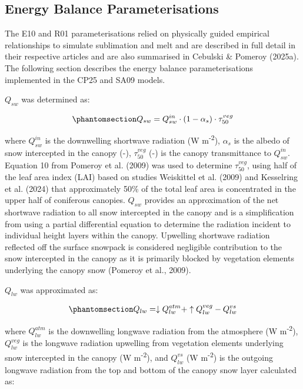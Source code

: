 \documentclass[
]{agujournal2019}
\begin{document}
\subsection{Energy Balance
Parameterisations}\label{energy-balance-parameterisations}

The E10 and R01 parameterisations relied on physically guided empirical
relationships to simulate sublimation and melt and are described in full
detail in their respective articles and are also summarised in Cebulski
\& Pomeroy (2025a). The following section describes the energy balance
parameterisations implemented in the CP25 and SA09 models.

\(Q_{sw}\) was determined as:

\begin{equation}\phantomsection\label{eq-sw}{
Q_{sw} = Q_{sw}^{in} \cdot (1 - \alpha_s) \cdot \tau_{50}^{veg}
}\end{equation}

where \(Q_{sw}^{in}\) is the downwelling shortwave radiation (W
m\textsuperscript{-2}), \(\alpha_s\) is the albedo of snow intercepted
in the canopy (-), \(\tau_{50}^{veg}\) (-) is the canopy transmittance
to \(Q_{sw}^{in}\). Equation 10 from Pomeroy et al. (2009) was used to
determine \(\tau_{50}^{veg}\), using half of the leaf area index (LAI)
based on studies Weiskittel et al. (2009) and Kesselring et al. (2024)
that approximately 50\% of the total leaf area is concentrated in the
upper half of coniferous canopies. \(Q_{sw}\) provides an approximation
of the net shortwave radiation to all snow intercepted in the canopy and
is a simplification from using a partial differential equation to
determine the radiation incident to individual height layers within the
canopy. Upwelling shortwave radiation reflected off the surface snowpack
is considered negligible contribution to the snow intercepted in the
canopy as it is primarily blocked by vegetation elements underlying the
canopy snow (Pomeroy et al., 2009).

\(Q_{lw}\) was approximated as:

\begin{equation}\phantomsection\label{eq-lw}{
Q_{lw} = \downarrow Q_{lw}^{atm} + \uparrow Q_{lw}^{veg} - Q_{lw}^{vs}
}\end{equation}

where \(Q_{lw}^{atm}\) is the downwelling longwave radiation from the
atmosphere (W m\textsuperscript{-2}), \(Q_{lw}^{veg}\) is the longwave
radiation upwelling from vegetation elements underlying snow intercepted
in the canopy (W m\textsuperscript{-2}), and \(Q_{lw}^{vs}\) (W
m\textsuperscript{-2}) is the outgoing longwave radiation from the top
and bottom of the canopy snow layer calculated as:
\end{document}
